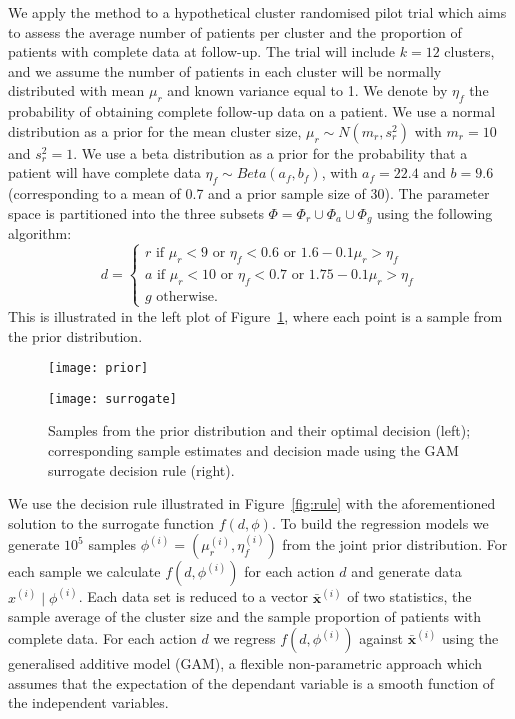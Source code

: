 \documentclass{article} %
\begin{document}
We apply the method to a hypothetical cluster randomised pilot trial which aims to assess the average number of patients per cluster and the proportion of patients with complete data at follow-up. The trial will include $k = 12$ clusters, and we assume the number of patients in each cluster will be normally distributed with mean $\mu_{r}$ and known variance equal to 1. We denote by $\eta_{f}$ the probability of obtaining complete follow-up data on a patient. We use a normal distribution as a prior for the mean cluster size, $\mu_{r} \sim N(m_{r}, s_{r}^{2})$ with $m_{r} = 10$ and $s_{r}^{2} = 1$. We use a beta distribution as a prior for the probability that a patient will have complete data $\eta_{f} \sim Beta(a_{f}, b_{f})$, with $a_{f} = 22.4$ and $b = 9.6$ (corresponding to a mean of 0.7 and a prior sample size of 30). The parameter space is partitioned into the three subsets $\Phi = \Phi_{r} \cup \Phi_{a} \cup \Phi_{g}$ using the following algorithm: 
\[
  d =\begin{cases}
               r \text{ if } \mu_{r} < 9 \text{ or } \eta_{f} < 0.6 \text{ or } 1.6 - 0.1\mu_{r} > \eta_{f} \\
               a \text{ if } \mu_{r} < 10 \text{ or } \eta_{f} < 0.7 \text{ or } 1.75 - 0.1\mu_{r} > \eta_{f} \\
               g \text{ otherwise.}
            \end{cases}
\]
This is illustrated in the left plot of Figure~\ref{fig:prior}, where each point is a sample from the prior distribution.

\begin{figure}
    \centering
    \begin{minipage}{0.35\textwidth}
        \centering
        \texttt{[image: prior]} %
    \end{minipage}\hfill
    \begin{minipage}{0.55\textwidth}
        \centering
        \texttt{[image: surrogate]} %
    \end{minipage}
    \caption{Samples from the prior distribution and their optimal decision (left); corresponding sample estimates and decision made using the GAM surrogate decision rule (right).}
    \label{fig:prior}
\end{figure}

We use the decision rule illustrated in Figure~\ref{fig:rule} with the aforementioned solution to the surrogate function $f(d, \phi)$. To build the regression models we generate $10^{5}$ samples $\phi^{(i)} = (\mu_{r}^{(i)}, \eta_{f}^{(i)})$ from the joint prior distribution. For each sample we calculate $f(d, \phi^{(i)})$ for each action $d$ and generate data $x^{(i)} \mid \phi^{(i)}$. Each data set is reduced to a vector $\bar{\mathbf{x}}^{(i)}$ of two statistics, the sample average of the cluster size and the sample proportion of patients with complete data. For each action $d$ we regress $f(d, \phi^{(i)})$ against $\bar{\mathbf{x}}^{(i)}$ using the generalised additive model (GAM), a flexible non-parametric approach which assumes that the expectation of the dependant variable is a smooth function of the independent variables.
\end{document}
